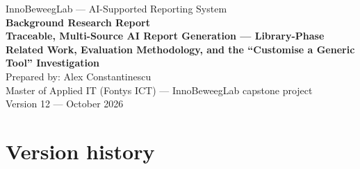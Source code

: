 \documentclass[11pt,a4paper]{article}
\begin{document}
\begin{titlepage}
\centering
\vspace*{1.5cm}
{\small InnoBeweegLab --- AI-Supported Reporting System}\\[1.2cm]
{\color{navy}\Huge\bfseries Background Research Report}\\[0.7cm]
{\color{teal}\Large\bfseries Traceable, Multi-Source AI Report Generation --- Library-Phase Related Work, Evaluation Methodology, and the ``Customise a Generic Tool'' Investigation}\\[1.8cm]
{\large Prepared by: Alex Constantinescu}\\[0.3cm]
{\large Master of Applied IT (Fontys ICT) --- InnoBeweegLab capstone project}\\[0.3cm]
{\large Version 12 --- October 2026}
\vfill
\end{titlepage}


\section*{Version history}


\clearpage
\tableofcontents

\clearpage
{}


\clearpage

\clearpage

\clearpage

\clearpage

\clearpage

\clearpage

\end{document}
